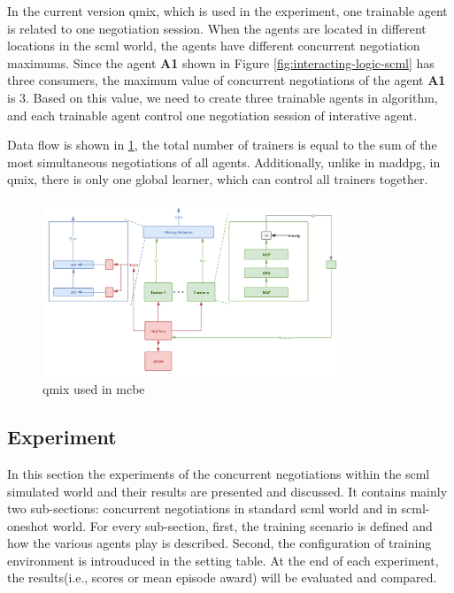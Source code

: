 In the current version \gls{qmix}, which is used in the experiment, one trainable agent is related to one negotiation session. When the agents are located in different locations in the scml world, the agents have different concurrent negotiation maximums. Since the agent \textbf{A1} shown in Figure \ref{fig:interacting-logic-scml} has three consumers, the maximum value of concurrent negotiations of the agent \textbf{A1} is 3. Based on this value, we need to create three trainable agents in algorithm, and each trainable agent control one negotiation session of interative agent.

Data flow is shown in \ref{fig:method-qmix-scml}, the total number of trainers is equal to the sum of the most simultaneous negotiations of all agents. Additionally, unlike in maddpg, in qmix, there is only one global learner, which can control all trainers together.

\begin{figure}[htbp]
\centering
\includegraphics[width=0.80\textwidth]{./images/scml-qmix.png}
\caption{\gls{qmix} used in \gls{mcbe}}
\label{fig:method-qmix-scml}
\end{figure}

\subsection{Experiment}
In this section the experiments of the concurrent negotiations within the scml simulated world and their results are presented and discussed. It contains mainly two sub-sections: concurrent negotiations in standard scml world and in scml-oneshot world. For every sub-section, first, the training scenario is defined and how the various agents play is described. Second, the configuration of training environment is introuduced in the setting table. At the end of each experiment, the results(i.e., scores or mean episode award) will be evaluated and compared.

